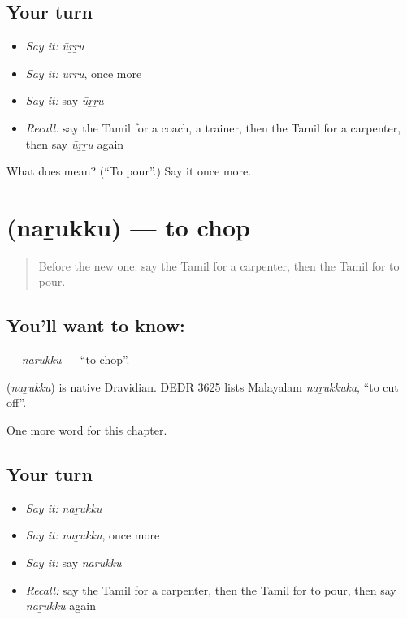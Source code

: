 \subsection*{Your turn}
\begin{itemize}
\raggedright
  \item \emph{Say it:} \emph{ūṟṟu}
  \item \emph{Say it:} \emph{ūṟṟu}, once more
  \item \emph{Say it:} say \emph{ūṟṟu}
  \item \emph{Recall:} say the Tamil for a coach, a trainer, then the Tamil for a carpenter, then say \emph{ūṟṟu} again
\end{itemize}

\begin{tcolorbox}[breakable,colback=teal!4,colframe=teal!35!black,title={Before you move on}]
What does  mean? (\textquotedblleft{}To pour\textquotedblright{}.) Say it once more.
\end{tcolorbox}
\section[\texorpdfstring{\ta{நறுக்கு} (naṟukku)}{நறுக்கு (naṟukku)}]{ (naṟukku) — to chop}

\label{lesson:TA-C194-narukku}



\begin{quote}
Before the new one: say the Tamil for a carpenter, then the Tamil for to pour.
\end{quote}

\subsection*{You'll want to know: }
\textbf{} — \emph{naṟukku} — \textquotedblleft{}to chop\textquotedblright{}.

\begin{cousinweb}
\textbf{} (\emph{naṟukku}) is native Dravidian. DEDR 3625 lists Malayalam \emph{naṟukkuka}, \textquotedblleft{}to cut off\textquotedblright{}.
\end{cousinweb}

\begin{grammarlens}[title={What you've built}]
One more word for this chapter.
\end{grammarlens}

\subsection*{Your turn}
\begin{itemize}
\raggedright
  \item \emph{Say it:} \emph{naṟukku}
  \item \emph{Say it:} \emph{naṟukku}, once more
  \item \emph{Say it:} say \emph{naṟukku}
  \item \emph{Recall:} say the Tamil for a carpenter, then the Tamil for to pour, then say \emph{naṟukku} again
\end{itemize}

